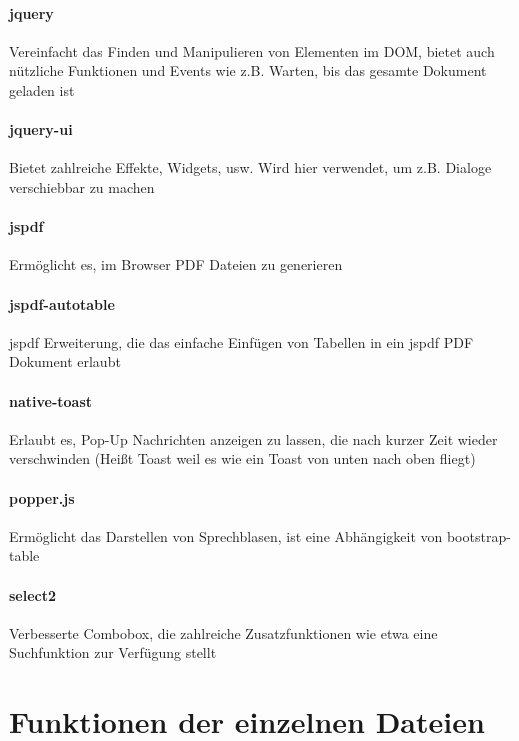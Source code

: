 \documentclass[12pt,pdftex,parskip=half]{scrartcl}
\begin{document}
            \paragraph{jquery}
            Vereinfacht das Finden und Manipulieren von Elementen im DOM, bietet auch nützliche Funktionen und Events wie z.B. Warten, bis das gesamte Dokument geladen ist

            \paragraph{jquery-ui}
            Bietet zahlreiche Effekte, Widgets, usw. Wird hier verwendet, um z.B. Dialoge verschiebbar zu machen

            \paragraph{jspdf}
            Ermöglicht es, im Browser PDF Dateien zu generieren

            \paragraph{jspdf-autotable}
            jspdf Erweiterung, die das einfache Einfügen von Tabellen in ein jspdf PDF Dokument erlaubt

            \paragraph{native-toast}
            Erlaubt es, Pop-Up Nachrichten anzeigen zu lassen, die nach kurzer Zeit wieder verschwinden (Heißt Toast weil es wie ein Toast von unten nach oben fliegt)

            \paragraph{popper.js}
            Ermöglicht das Darstellen von Sprechblasen, ist eine Abhängigkeit von bootstrap-table

            \paragraph{select2}
            Verbesserte Combobox, die zahlreiche Zusatzfunktionen wie etwa eine Suchfunktion zur Verfügung stellt

            \newpage


\section{Funktionen der einzelnen Dateien}
\end{document}
